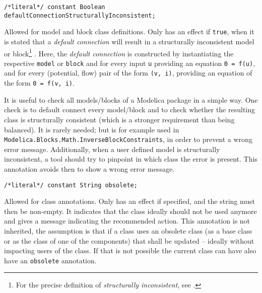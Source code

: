\begin{annotationdefinition}[defaultConnectionStructurallyInconsistent]
\begin{synopsis}\begin{lstlisting}
/*literal*/ constant Boolean defaultConnectionStructurallyInconsistent;
\end{lstlisting}\end{synopsis}
\begin{semantics}
Allowed for model and block class definitions.
Only has an effect if \lstinline!true!, when it is stated that a \emph{default connection} will result in a structurally inconsistent model or block\footnote{%
  For the precise definition of \emph{structurally inconsistent}, see \textcite{Pantelides1988ConsistentInitialization}.}%
.
Here, the \emph{default connection} is constructed by instantiating the respective \lstinline!model! or \lstinline!block! and for every input \lstinline!u! providing an equation \lstinline!0 = f(u)!, and for every (potential, flow) pair of the form \lstinline!(v, i)!, providing an equation of the form \lstinline!0 = f(v, i)!.

\begin{nonnormative}
It is useful to check all models/blocks of a Modelica package in a simple way.
One check is to default connect every model/block and to check whether the resulting class is structurally consistent (which is a stronger requirement than being balanced).
It is rarely needed; but is for example used in \lstinline!Modelica.Blocks.Math.InverseBlockConstraints!, in order to prevent a wrong error message.
Additionally, when a user defined model is structurally inconsistent, a tool should try to pinpoint in which class the error is present.
This annotation avoids then to show a wrong error message.
\end{nonnormative}
\end{semantics}
\end{annotationdefinition}

\begin{annotationdefinition}[obsolete]
\begin{synopsis}\begin{lstlisting}
/*literal*/ constant String obsolete;
\end{lstlisting}\end{synopsis}
\begin{semantics}
Allowed for class annotations.
Only has an effect if specified, and the string must then be non-empty.
It indicates that the class ideally should not be used anymore and gives a message indicating the recommended action.
This annotation is not inherited, the assumption is that if a class uses an obsolete class (as a base class or as the class of one of the components) that shall be updated -- ideally without impacting users of the class.
If that is not possible the current class can have also have an \lstinline!obsolete! annotation.
\end{semantics}
\end{annotationdefinition}

